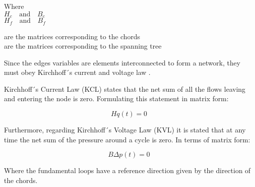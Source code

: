 \begin{minipage}[t]{0.20\textwidth}
Where\\
\hspace*{8mm} $H_c \quad \text{and} \quad B_c$ \\
\hspace*{8mm} $H_f \quad \text{and} \quad B_f$ 
\end{minipage}
\begin{minipage}[t]{0.68\textwidth}
\vspace*{2mm}
\hspace*{8mm} are the matrices corresponding to the chords\\
\hspace*{8mm} are the matrices corresponding to the spanning tree 
\end{minipage}

Since the edges variables are elements interconnected to form a network, 
they must obey Kirchhoff´s current and voltage law \cite{GraphModel}. 

Kirchhoff´s Current Law (KCL) states that the net sum of all the flows leaving and entering the node is zero. Formulating this statement in matrix form:

\begin{equation}
  \label{KCL}
  Hq(t) = 0
\end{equation}

Furthermore, regarding Kirchhoff´s Voltage Law (KVL) it is stated that at any time the net sum of the pressure around a cycle 
is zero. In terms of matrix form:

\begin{equation}
 \label{KVL} 
 B\Delta p (t) = 0
\end{equation}

Where the fundamental loops have a reference direction given by the direction of the 
chords. 





 